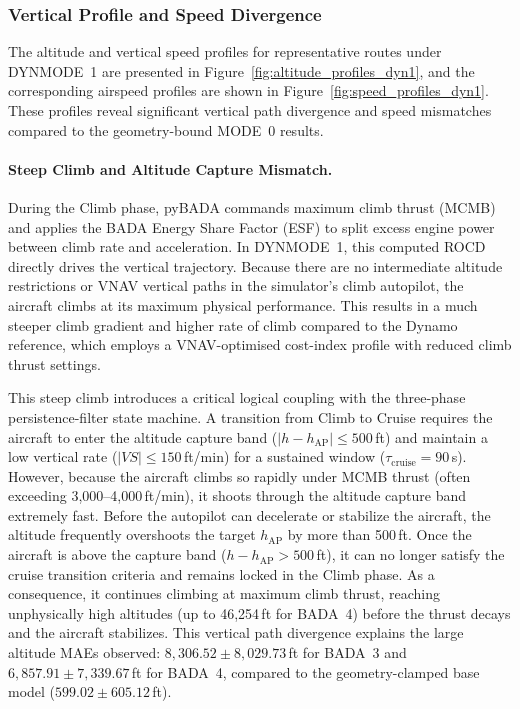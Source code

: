\subsubsection{Vertical Profile and Speed Divergence}

The altitude and vertical speed profiles for representative routes under DYNMODE~1 are presented in Figure~\ref{fig:altitude_profiles_dyn1}, and the corresponding airspeed profiles are shown in Figure~\ref{fig:speed_profiles_dyn1}. These profiles reveal significant vertical path divergence and speed mismatches compared to the geometry-bound MODE~0 results.

\paragraph{Steep Climb and Altitude Capture Mismatch.}
During the Climb phase, pyBADA commands maximum climb thrust (MCMB) and applies the BADA Energy Share Factor (ESF) to split excess engine power between climb rate and acceleration. In DYNMODE~1, this computed ROCD directly drives the vertical trajectory. Because there are no intermediate altitude restrictions or VNAV vertical paths in the simulator's climb autopilot, the aircraft climbs at its maximum physical performance. This results in a much steeper climb gradient and higher rate of climb compared to the Dynamo reference, which employs a VNAV-optimised cost-index profile with reduced climb thrust settings.

This steep climb introduces a critical logical coupling with the three-phase persistence-filter state machine. A transition from Climb to Cruise requires the aircraft to enter the altitude capture band ($|h - h_{\text{AP}}| \le 500$\,ft) and maintain a low vertical rate ($|VS| \le 150$\,ft/min) for a sustained window ($\tau_{\text{cruise}} = 90$\,s). However, because the aircraft climbs so rapidly under MCMB thrust (often exceeding 3,000--4,000\,ft/min), it shoots through the altitude capture band extremely fast. Before the autopilot can decelerate or stabilize the aircraft, the altitude frequently overshoots the target $h_{\text{AP}}$ by more than 500\,ft. Once the aircraft is above the capture band ($h - h_{\text{AP}} > 500$\,ft), it can no longer satisfy the cruise transition criteria and remains locked in the Climb phase. As a consequence, it continues climbing at maximum climb thrust, reaching unphysically high altitudes (up to 46,254\,ft for BADA~4) before the thrust decays and the aircraft stabilizes. This vertical path divergence explains the large altitude MAEs observed: $8{,}306.52 \pm 8{,}029.73$\,ft for BADA~3 and $6{,}857.91 \pm 7{,}339.67$\,ft for BADA~4, compared to the geometry-clamped base model ($599.02 \pm 605.12$\,ft).

